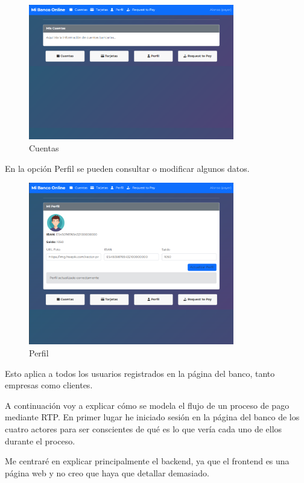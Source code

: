 \begin{figure}[H]
  \centering
  \includegraphics[width=0.8\textwidth]{Imagenes/Cuentas.png}
  \caption{Cuentas}
  \label{fig:Cuentas}
\end{figure}

En la opción Perfil se pueden consultar o modificar algunos datos.

\begin{figure}[H]
  \centering
  \includegraphics[width=0.8\textwidth]{Imagenes/Perfil.png}
  \caption{Perfil}
  \label{fig:Perfil}
\end{figure}

Esto aplica a todos los usuarios registrados en la página del banco, tanto empresas como clientes.

A continuación voy a explicar cómo se modela el flujo de un proceso de pago mediante RTP. En primer lugar he iniciado sesión en la página del banco de los cuatro actores para ser conscientes de qué es lo que vería cada uno de ellos durante el proceso.

Me centraré en explicar principalmente el backend, ya que el frontend es una página web y no creo que haya que detallar demasiado.


